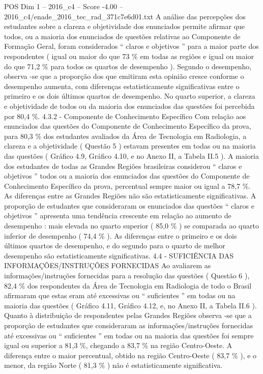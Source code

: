 \begin{textsample}{POS Dim 1 – 2016\_c4 – Score -4.00 – 2016\_c4/enade\_2016\_tec\_rad\_371c7e6d01.txt}
A análise das percepções dos estudantes sobre a clareza e objetividade dos enunciados permite afirmar que todos, ou a maioria dos enunciados de questões relativas ao Componente de Formação Geral, foram considerados “ claros e objetivos ” para a maior parte dos respondentes ( igual ou maior do que 73 \% em todas as regiões e igual ou maior do que 71,2 \% para todos os quartos de desempenho ).
Segundo o desempenho, observa -se que a proporção dos que emitiram esta opinião cresce conforme o desempenho aumenta, com diferenças estatisticamente significativas entre o primeiro e os dois últimos quartos de desempenho.
No quarto superior, a clareza e objetividade de todos ou da maioria dos enunciados das questões foi percebida por 80,4 \%. 4.3.2 - Componente de Conhecimento Específico Com relação aos enunciados das questões do Componente de Conhecimento Específico da prova, para 80,3 \% dos estudantes avaliados da Área de Tecnologia em Radiologia, a clareza e a objetividade ( Questão 5 ) estavam presentes em todas ou na maioria das questões ( Gráfico 4.9, Gráfico 4.10, e no Anexo II, a Tabela II.5 ).
A maioria dos estudantes de todas as Grandes Regiões brasileiras considerou “ claros e objetivos ” todos ou a maioria dos enunciados das questões do Componente de Conhecimento Específico da prova, percentual sempre maior ou igual a 78,7 \%.
As diferenças entre as Grandes Regiões não são estatisticamente significativas.
A proporção de estudantes que consideraram os enunciados das questões “ claros e objetivos ” apresenta uma tendência crescente em relação ao aumento de desempenho : mais elevada no quarto superior ( 85,0 \% ) se comparada ao quarto inferior de desempenho ( 74,4 \% ).
As diferenças entre o primeiro e os dois últimos quartos de desempenho, e do segundo para o quarto de melhor desempenho são estatisticamente significativas. 4.4 - SUFICIÊNCIA DAS INFORMAÇÕES/INSTRUÇÕES FORNECIDAS Ao avaliarem as informações/instruções fornecidas para a resolução das questões ( Questão 6 ), 82,4 \% dos respondentes da Área de Tecnologia em Radiologia de todo o Brasil afirmaram que estas eram até excessivas ou “ suficientes ” em todas ou na maioria das questões ( Gráfico 4.11, Gráfico 4.12, e, no Anexo II, a Tabela II.6 ).
Quanto à distribuição de respondentes pelas Grandes Regiões observa -se que a proporção de estudantes que consideraram as informações/instruções fornecidas até excessivas ou “ suficientes ” em todas ou na maioria das questões foi sempre igual ou superior a 81,3 \%, chegando a 83,7 \% na região Centro-Oeste.
A diferença entre o maior percentual, obtido na região Centro-Oeste ( 83,7 \% ), e o menor, da região Norte ( 81,3 \% ) não é estatisticamente significativa.

\end{textsample}

